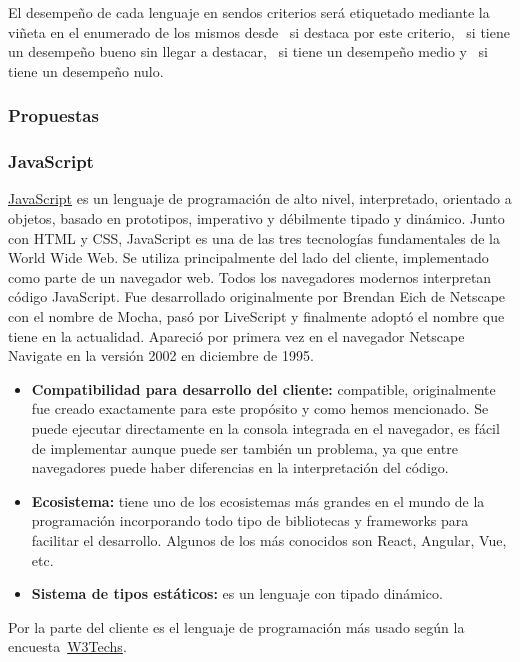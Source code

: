 El desempeño de cada lenguaje en sendos criterios será etiquetado mediante la viñeta en el enumerado de los mismos desde \esp~si destaca por este criterio, \bien~si tiene un desempeño bueno sin llegar a destacar, \regular~si tiene un desempeño medio y \mal~si tiene un desempeño nulo.

\subsubsection{Propuestas}

\subsubsection{JavaScript}

\href{https://es.wikipedia.org/w/index.php?title=JavaScript&oldid=161023746}{JavaScript} es un lenguaje de programación de alto nivel, interpretado, orientado a objetos, basado en prototipos, imperativo y débilmente tipado y dinámico. Junto con HTML y CSS, JavaScript es una de las tres tecnologías fundamentales de la World Wide Web. Se utiliza principalmente del lado del cliente, implementado como parte de un navegador web. Todos los navegadores modernos interpretan código JavaScript. Fue desarrollado originalmente por Brendan Eich de Netscape con el nombre de Mocha, pasó por LiveScript y finalmente adoptó el nombre que tiene en la actualidad. Apareció por primera vez en el navegador Netscape Navigate en la versión 2002 en diciembre de 1995.

\begin{itemize}
    \item[\esp] \textbf{Compatibilidad para desarrollo del cliente:} compatible, originalmente fue creado exactamente para este propósito y como hemos mencionado. Se puede ejecutar directamente en la consola integrada en el navegador, es fácil de implementar aunque puede ser también un problema, ya que entre navegadores puede haber diferencias en la interpretación del código.
    \item[\esp] \textbf{Ecosistema:} tiene uno de los ecosistemas más grandes en el mundo de la programación incorporando todo tipo de bibliotecas y frameworks para facilitar el desarrollo. Algunos de los más conocidos son React, Angular, Vue, etc.
    \item[\mal] \textbf{Sistema de tipos estáticos:} es un lenguaje con tipado dinámico.
\end{itemize}

Por la parte del cliente es el lenguaje de programación más usado según la encuesta~\href{https://w3techs.com/technologies/overview/client_side_language}{W3Techs}.


